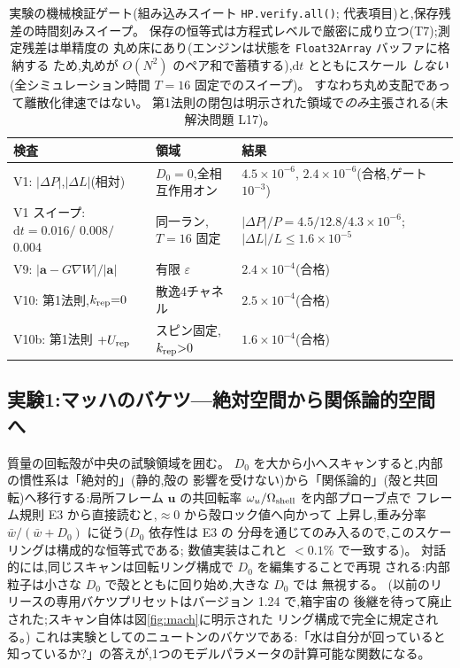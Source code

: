 \documentclass[a4paper,10pt,twocolumn]{ltjsarticle}
\newcommand{\ud}{\mathrm{d}}
\newcommand{\vect}[1]{\bm{#1}}
\newcommand{\Dz}{D_0}
\begin{document}
\begin{table}[b]
\caption{\label{tab:verify}%
実験の機械検証ゲート(組み込みスイート \texttt{HP.verify.all()};
代表項目)と,保存残差の時間刻みスイープ。
保存の恒等式は方程式レベルで厳密に成り立つ(T7);測定残差は単精度の
丸め床にあり(エンジンは状態を \texttt{Float32Array} バッファに格納する
ため,丸めが $O(N^2)$ のペア和で蓄積する),$\ud t$ とともにスケール
\emph{しない}(全シミュレーション時間 $T = 16$ 固定でのスイープ)。
すなわち丸め支配であって離散化律速ではない。
第1法則の閉包は明示された領域で\emph{のみ}主張される(未解決問題
L17)。}
\centering
\small
\setlength{\tabcolsep}{4pt}%
\begin{tabular}{p{}p{}p{}}
\toprule
検査 & 領域 & 結果 \\
\midrule
V1: $|\Delta P|$,$|\Delta L|$(相対) &
$\Dz{=}0$,全相互作用オン & $4.5\times10^{-6}$,
$2.4\times10^{-6}$(合格,ゲート $10^{-3}$) \\
V1 スイープ:\newline $\ud t{=}0.016/$ $0.008/$ $0.004$ &
同一ラン,$T{=}16$ 固定 & $|\Delta P|/P = 4.5/12.8/4.3
\times10^{-6}$;$|\Delta L|/L \le 1.6\times10^{-5}$ \\
V9: $|\vect{a}-G\nabla W|/|\vect{a}|$ &
有限 $\varepsilon$ & $2.4\times10^{-4}$(合格) \\
V10: 第1法則,$k_{\rm rep}{=}0$ &
散逸4チャネル & $2.5\times10^{-4}$(合格) \\
V10b: 第1法則 $+U_{\rm rep}$ &
スピン固定,$k_{\rm rep}{>}0$ & $1.6\times10^{-4}$(合格) \\
\bottomrule
\end{tabular}
\end{table}

\subsection{実験1:マッハのバケツ---絶対空間から関係論的空間へ}
\label{sec:exp1}

質量の回転殻が中央の試験領域を囲む。
$\Dz$ を大から小へスキャンすると,内部の慣性系は「絶対的」(静的,殻の
影響を受けない)から「関係論的」(殻と共回転)へ移行する:局所フレーム
$\vect{u}$ の共回転率 $\omega_u/\Omega_{\rm shell}$ を内部プローブ点で
フレーム規則 E3 から直接読むと,$\approx 0$ から殻ロック値へ向かって
上昇し,重み分率 $\bar w/(\bar w + \Dz)$ に従う($\Dz$ 依存性は E3 の
分母を通じてのみ入るので,このスケーリングは構成的な恒等式である;
数値実装はこれと $<0.1\%$ で一致する)。
対話的には,同じスキャンは回転リング構成で $\Dz$ を編集することで再現
される:内部粒子は小さな $\Dz$ で殻とともに回り始め,大きな $\Dz$ では
無視する。
(以前のリリースの専用バケツプリセットはバージョン 1.24 で,箱宇宙の
後継を待って廃止された;スキャン自体は図\ref{fig:mach}に明示された
リング構成で完全に規定される。)
これは実験としてのニュートンのバケツである:「水は自分が回っていると
知っているか?」の答えが,1つのモデルパラメータの計算可能な関数になる。
\end{document}
